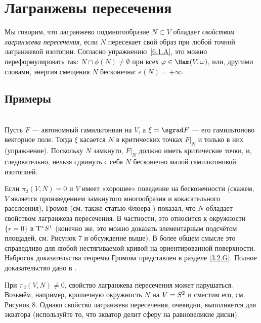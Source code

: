 \section{Лагранжевы пересечения}

Мы говорим, что лагранжево подмногообразие $N \subset V$ обладает \emph{свойством лагранжева пересечения}, если $N$ пересекает свой образ при любой точной лагранжевой изотопии.
Согласно упражнению~\ref{6.1.A}, это можно переформулировать так: $N \cap \phi (N) \ne \emptyset$ при всех $\phi \in \Ham (V, \omega)$, или, другими словами, энергия смещения $N$ бесконечна: $e (N) = + \infty$.

\subsection*{Примеры} 

\begin{ex}{}\\
Пусть $F$ — автономный гамильтониан на $V$, а $\xi = \sgrad F$ — его гамильтоново
векторное поле. 
Тогда $\xi$ касается $N$ в критических точках $F|_N$ и только в них
(упражнение). 
Поскольку $N$ замкнуто, $F|_N$ должно иметь критические точки, и,
следовательно, нельзя сдвинуть с себя $N$ бесконечно малой
гамильтоновой изотопией. 
\end{ex}

\begin{ex}{}\label{6.2.B}
Если $\pi_2 (V, N) = 0$ и $V$ имеет «хорошее» поведение на
бесконечности (скажем, $V$ является произведением замкнутого
многообразия и кокасательного расслоения), Громов \cite{G1} (см. также
статью Флоера \cite{F}) показал, что $N$ обладает свойством лагранжева
пересечения. 
В частности, это относится к окружности $\{r = 0\}$ в $\mathrm{T}^\ast S^1$
(конечно же, это можно доказать элементарным подсчётом площадей,
см. Рисунок 7 и обсуждение выше). 
В более общем смысле это справедливо для любой нестягиваемой кривой на
ориентированной поверхности. 
Набросок доказательства теоремы Громова представлен в разделе \ref{3.2.G}.
Полное доказательство дано в \cite[Chap. X]{AL}. 

При $\pi_2 (V, N) \ne 0$, свойство лагранжева пересечения может нарушаться.
Возьмём, например, крошечную окружность $N$ на $V \z= S^2$ и сместим его, см. Рисунок 8.
Однако свойство лагранжева пересечения, очевидно, выполняется для экватора (используйте то, что экватор делит сферу на равновеликие диски).
\end{ex}




